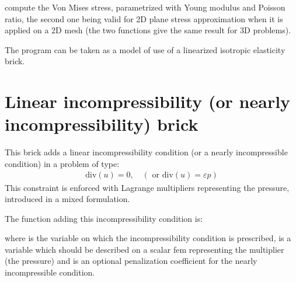 \documentclass[a4paper,11pt,english]{sphinxmanual}
\begin{document}
compute the Von Mises stress, parametrized with Young modulus and Poisson ratio, the second one being valid for 2D plane stress approximation when it is applied on a 2D mesh (the two functions give the same result for 3D problems).

The program  can be taken as a model of use of a linearized isotropic elasticity brick.


\section{Linear incompressibility (or nearly incompressibility) brick}
\label{\detokenize{userdoc/model_linear_elasticity:linear-incompressibility-or-nearly-incompressibility-brick}}
This brick adds a linear incompressibility condition (or a nearly incompressible
condition) in a problem of type:
\begin{equation*}
\begin{split}\mbox{div}(u) = 0,\quad (\mbox{ or } \mbox{div}(u) = \varepsilon p)\end{split}
\end{equation*}
This constraint is enforced with Lagrange multipliers representing the pressure,
introduced in a mixed formulation.

The function adding this incompressibility condition is:

\begin{sphinxVerbatim}[commandchars=\\\{\}]
  
                  
               
\end{sphinxVerbatim}

where  is the variable on which the incompressibility condition is
prescribed,  is a variable which should be described on a
scalar fem representing the multiplier (the pressure) and 
is an optional penalization coefficient for the nearly incompressible condition.
\end{document}
